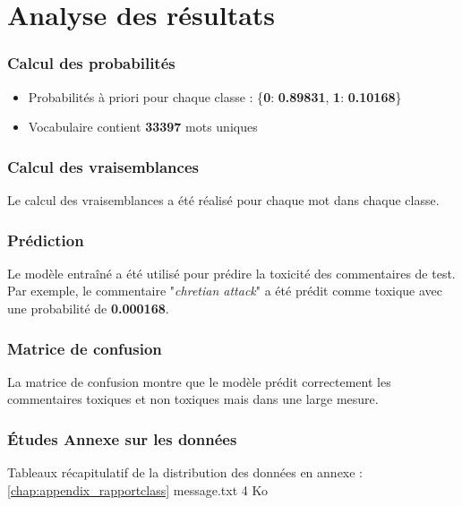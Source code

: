 \section{Analyse des résultats}

\subsubsection{Calcul des probabilités}

\begin{itemize}
    \item Probabilités à priori pour chaque classe : \{\textbf{0}: \textbf{0.89831}, \textbf{1}: \textbf{0.10168}\}
    \item Vocabulaire contient \textbf{33397} mots uniques
\end{itemize}

\subsubsection{Calcul des vraisemblances}

Le calcul des vraisemblances a été réalisé pour chaque mot dans chaque classe.

\subsubsection{Prédiction}

Le modèle entraîné a été utilisé pour prédire la toxicité des commentaires de test. Par exemple, le commentaire "\textit{chretian attack}" a été prédit comme toxique avec une probabilité de \textbf{0.000168}.

\subsubsection{Matrice de confusion}

La matrice de confusion montre que le modèle prédit correctement les commentaires toxiques et non toxiques mais dans une large mesure.



\subsubsection{Études Annexe sur les données}

Tableaux récapitulatif de la distribution des données en annexe :  \ref{chap:appendix_rapportclass}
message.txt
4 Ko
